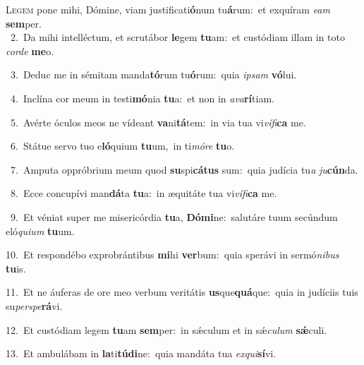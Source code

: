\lettrine{\initial\textcolor{\initialcolor}{L}}{egem} pone mihi, Dómine, viam justificati\-\textbf{ó}\-num tu\-\textbf{á}\-rum:~\star et exquíram \textit{e}\-\textit{am} \textbf{sem}\-per.\\
{\numbfont\textcolor{\numbcolor}{~2.}}~Da mihi intelléctum, et scrutábor \textbf{le}\-gem \textbf{tu}\-am:~\star et custódiam illam in toto \textit{cor}\-\textit{de} \textbf{me}\-o.\par
{\numbfont\textcolor{\numbcolor}{~3.}}~Deduc me in sémitam manda\-\textbf{tó}\-rum tu\-\textbf{ó}\-rum:~\star quia \textit{ip}\-\textit{sam} \textbf{vó}\-lui.\par
{\numbfont\textcolor{\numbcolor}{~4.}}~Inclína cor meum in testi\-\textbf{mó}\-nia \textbf{tu}\-a:~\star et non in \textit{a}\-\textit{va}\textbf{rí}tiam.\par
{\numbfont\textcolor{\numbcolor}{~5.}}~Avérte óculos meos ne vídeant \textbf{va}\-ni\-\textbf{tá}\-tem:~\star in via tua vi\-\textit{ví}\-\textit{fi}\textbf{ca} me.\par
{\numbfont\textcolor{\numbcolor}{~6.}}~Státue servo tuo e\-\textbf{ló}\-quium \textbf{tu}\-um,~\star in ti\-\textit{mó}\-\textit{re} \textbf{tu}\-o.\par
{\numbfont\textcolor{\numbcolor}{~7.}}~Amputa oppróbrium meum quod \textbf{su}\-spi\-\textbf{cá}\-\textbf{tus} sum:~\star quia judícia tu\textit{a} \textit{ju}\-\textbf{cún}da.\par
{\numbfont\textcolor{\numbcolor}{~8.}}~Ecce concupívi man\-\textbf{dá}\-ta \textbf{tu}\-a:~\star in æquitáte tua vi\-\textit{ví}\-\textit{fi}\textbf{ca} me.\par
{\numbfont\textcolor{\numbcolor}{~9.}}~Et véniat super me misericórdia \textbf{tu}\-a, \textbf{Dó}\-\textbf{mi}ne:~\star salutáre tuum secúndum eló\-\textit{qui}\-\textit{um} \textbf{tu}\-um.\par
{\numbfont\textcolor{\numbcolor}{10.}}~Et respondébo exprobrántibus \textbf{mi}\-hi \textbf{ver}\-bum:~\star quia sperávi in sermó\-\textit{ni}\-\textit{bus} \textbf{tu}\-is.\par
{\numbfont\textcolor{\numbcolor}{11.}}~Et ne áuferas de ore meo verbum veritátis \textbf{us}\-que\-\textbf{quá}\-que:~\star quia in judíciis tuis su\-\textit{per}\-\textit{spe}\textbf{rá}vi.\par
{\numbfont\textcolor{\numbcolor}{12.}}~Et custódiam legem \textbf{tu}\-am \textbf{sem}\-per:~\star in sǽculum et in sǽ\-\textit{cu}\-\textit{lum} \textbf{sǽ}\-culi.\par
{\numbfont\textcolor{\numbcolor}{13.}}~Et ambulábam in \textbf{la}\-ti\-\textbf{tú}\-\textbf{di}ne:~\star quia mandáta tua \textit{ex}\-\textit{qui}\textbf{sí}vi.\par
